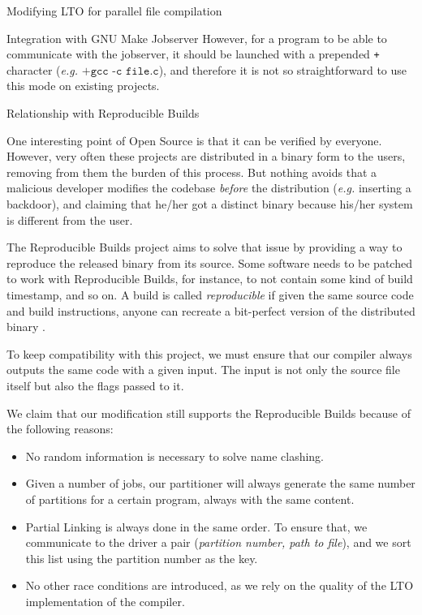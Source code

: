 \begin{section}{Modifying LTO for parallel file compilation}
\begin{subsection}{Integration with GNU Make Jobserver}
However, for a program to be able to communicate with the jobserver, it should
be launched with a prepended \texttt{+} character (\textit{e.g.} $\texttt{+gcc
-c file.c}$), and therefore it is not so straightforward to use this mode on
existing projects.

\end{subsection}

\begin{subsection}{Relationship with Reproducible Builds}\label{sec:repro_builds}

One interesting point of Open Source is that it can be verified by everyone.
However, very often these projects are distributed in a binary form to the
users, removing from them the burden of this process. But nothing avoids that a
malicious developer modifies the codebase \textit{before} the distribution
(\textit{e.g.} inserting a backdoor), and claiming that he/her got a distinct
binary because his/her system is different from the user.

The Reproducible Builds project aims to solve that issue by providing a way to
reproduce the released binary from its source. Some software needs to
be patched to work with Reproducible Builds, for instance,
to not contain some kind of build timestamp, and so on. A build
is called \textit{reproducible} if given the same source code and build
instructions, anyone can recreate a bit-perfect version of the distributed
binary \citep{reproducible_builds}.

To keep compatibility with this project, we must ensure that our compiler
always outputs the same code with a given input. The input is not only
the source file itself but also the flags passed to it.

We claim that our modification still supports the Reproducible Builds because
of the following reasons:

\begin{itemize}
	\item No random information is necessary to solve name clashing.
	\item Given a number of jobs, our partitioner will always generate
	the same number of partitions for a certain program, always with the same content.
	\item Partial Linking is always done in the same order. To ensure that,
	we communicate to the driver a pair (\textit{partition number, path to file}),
	and we sort this list using the partition number as the key.
	\item No other race conditions are introduced, as we rely on the quality of
	the LTO implementation of the compiler.
\end{itemize}


\end{subsection}
\end{section}
